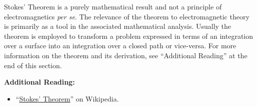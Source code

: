 Stokes' Theorem is a purely mathematical result and not a principle of electromagnetics \emph{per se}.
The relevance of the theorem to electromagnetic theory is primarily as a tool in the associated mathematical analysis.
Usually the theorem is employed to transform a problem expressed in terms of an integration over a surface into an integration over a closed path or vice-versa.
For more information on the theorem and its derivation, see ``Additional Reading'' at the end of this section.


{\bf Additional Reading:}
\begin{itemize}
\item ``\href{https://en.wikipedia.org/wiki/Stokes'_theorem}{Stokes' Theorem}'' on Wikipedia.
\end{itemize}



